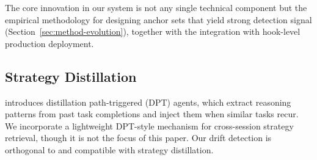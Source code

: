 The core innovation in our system is not any single technical
component but the empirical methodology for designing anchor sets
that yield strong detection signal (Section~\ref{sec:method-evolution}),
together with the integration with hook-level production
deployment.

\subsection{Strategy Distillation}
\label{sec:related-strategy}

\citet{dptagent} introduces distillation path-triggered (DPT)
agents, which extract reasoning patterns from past task
completions and inject them when similar tasks recur. We
incorporate a lightweight DPT-style mechanism for cross-session
strategy retrieval, though it is not the focus of this paper. Our drift detection is
orthogonal to and compatible with strategy distillation.
